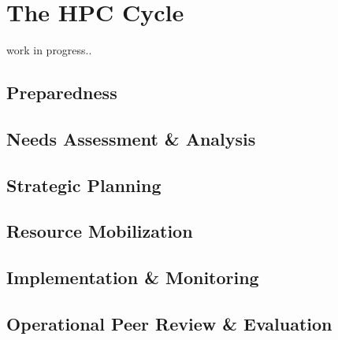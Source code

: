 \documentclass[letterpaper,10pt,english]{jupyterBook}
\begin{document}
\chapter{The HPC Cycle}
\label{\detokenize{part3/hpccycle:the-hpc-cycle}}\label{\detokenize{part3/hpccycle::doc}}
\sphinxAtStartPar
work in progress..


\section{Preparedness}
\label{\detokenize{part3/preparedness:preparedness}}\label{\detokenize{part3/preparedness::doc}}

\section{Needs Assessment \& Analysis}
\label{\detokenize{part3/needs assessment:needs-assessment-analysis}}\label{\detokenize{part3/needs assessment::doc}}

\section{Strategic Planning}
\label{\detokenize{part3/strategic planning:strategic-planning}}\label{\detokenize{part3/strategic planning::doc}}

\section{Resource Mobilization}
\label{\detokenize{part3/resource mobilization:resource-mobilization}}\label{\detokenize{part3/resource mobilization::doc}}

\section{Implementation \& Monitoring}
\label{\detokenize{part3/implementation and monitoring:implementation-monitoring}}\label{\detokenize{part3/implementation and monitoring::doc}}

\section{Operational Peer Review \& Evaluation}
\label{\detokenize{part3/opr:operational-peer-review-evaluation}}\label{\detokenize{part3/opr::doc}}
\end{document}
